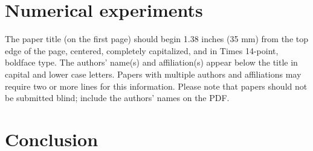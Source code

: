 \documentclass{article}
\begin{document}
\section{Numerical experiments}
\label{sec:numerical}

The paper title (on the first page) should begin 1.38 inches (35 mm) from the
top edge of the page, centered, completely capitalized, and in Times 14-point,
boldface type.  The authors' name(s) and affiliation(s) appear below the title
in capital and lower case letters.  Papers with multiple authors and
affiliations may require two or more lines for this information. Please note
that papers should not be submitted blind; include the authors' names on the
PDF.

\section{Conclusion}
\label{sec:conclusion}



\vfill\pagebreak



\end{document}
